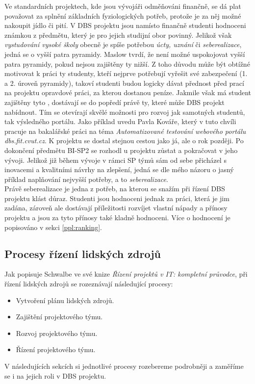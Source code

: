 Ve standardních projektech, kde jsou vývojáři odměňováni finančně, se dá plat považovat za splnění základních fyziologických potřeb, protože je za něj možné nakoupit jídlo či pití. V DBS projektu jsou namísto finančně studenti hodnoceni známkou z předmětu, který je pro jejich studijní obor povinný. Jelikož však \emph{vystudování vysoké školy} obecně je spíše potřebou \emph{úcty, uznání} či \emph{seberealizace}, jedná se o vyšší patra pyramidy. Maslow \cite{maslow} tvrdí, že není možné uspokojovat vyšší patra pyramidy, pokud nejsou zajištěny ty nižší. Z toho důvodu může být obtížné motivovat k práci ty studenty, kteří nejprve potřebují vyřešit své zabezpečení (1. a 2. úroveň pyramidy), takoví studenti budou logicky dávat přednost před prací na projektu opravdové práci, za kterou dostanou peníze. Jakmile však má student zajištěny tyto , dostávají se do popředí právě ty, které může DBS projekt nabídnout. Tím se otevírají skvělé možnosti pro rozvoj jak samotných studentů, tak výsledného portálu. Jako příklad uvedu Pavla Kováře, který v tuto chvíli pracuje na bakalářské práci na téma \emph{Automatizované testování webového portálu dbs.fit.cvut.cz}. K projektu se dostal stejnou cestou jako já, ale o rok později. Po dokončení předmětu BI-SP2 se rozhodl u projektu zůstat a pokračovat v jeho vývoji. Jelikož již během vývoje v rámci SP týmů sám od sebe přicházel s inovacemi a kvalitními návrhy na zlepšení, jedná se dle mého názoru o jasný příklad naplňování nejvyšší potřeby, a to \emph{seberealizace}.\\
Právě seberealizace je jedna z potřeb, na kterou se snažím při řízení DBS projektu klást důraz. Studenti jsou hodnoceni jednak za práci, která je jim zadána, zároveň ale dostávají příležitosti rozvíjet vlastní nápady a přínosy projektu a jsou za tyto přínosy také kladně hodnoceni. Více o hodnocení je popisováno v sekci \ref{ppl:ranking}.

\subsection{Procesy řízení lidských zdrojů}

Jak popisuje Schwalbe \cite{schwalbe} ve své knize \emph{Řízení projektů v IT: kompletní průvodce}, při řízení lidských zdrojů se rozeznávají následující procesy:
\begin{itemize}
	\item Vytvoření plánu lidských zdrojů.
	\item Zajištění projektového týmu.
	\item Rozvoj projektového týmu.
	\item Řízení projektového týmu.
\end{itemize}
V následujících sekcích si jednotlivé procesy rozebereme podrobněji a zaměříme se i na jejich roli v DBS projektu.

